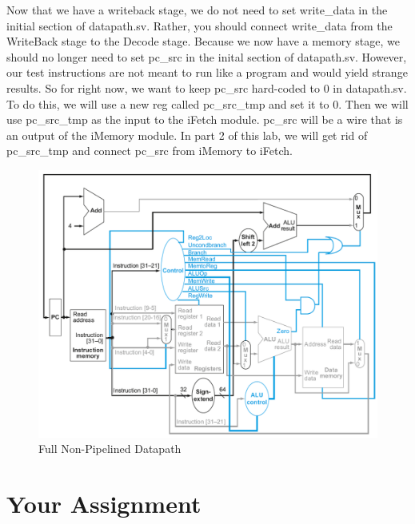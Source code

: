 Now that we have a writeback stage, we do not need to set write\_data in the initial section of datapath.sv.  Rather, you should connect write\_data from the WriteBack stage to the Decode stage.  Because we now have a memory stage, we should no longer need to set pc\_src in the inital section of datapath.sv.  However, our test instructions are not meant to run like a program and would yield strange results.  So for right now, we want to keep pc\_src hard-coded to 0 in datapath.sv.  To do this, we will use a new reg called pc\_src\_tmp and set it to 0.  Then we will use pc\_src\_tmp as the input to the iFetch module.  pc\_src will be a wire that is an output of the iMemory module.  In part 2 of this lab, we will get rid of pc\_src\_tmp and connect pc\_src from iMemory to iFetch.

\begin{figure}
\caption{Full Non-Pipelined Datapath}\label{fig:datapath}
\begin{center}
\includegraphics[width=\textwidth]{../images/non_pipelined_datapath.png}
\end{center}
\end{figure}

\section{Your Assignment}

